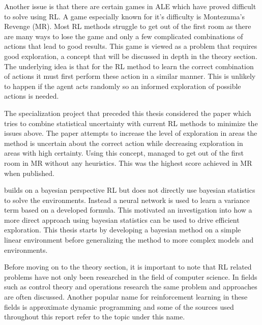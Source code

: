 Another issue is that there are certain games in ALE which have proved difficult to solve using RL. A game especially known for it's difficulty is Montezuma's Revenge (MR). Most RL methods struggle to get out of the first room as there are many ways to lose the game and only a few complicated combinations of actions that lead to good results. This game is viewed as a problem that requires good exploration, a concept that will be discussed in depth in the theory section. The underlying idea is that for the RL method to learn the correct combination of actions it must first perform these action in a similar manner. This is unlikely to happen if the agent acts randomly so an informed exploration of possible actions is needed.

The specialization project that preceded this thesis considered the paper \cite{donoghue_2017} which tries to combine statistical uncertainty with current RL methods to minimize the issues above. The paper attempts to increase the level of exploration in areas the method is uncertain about the correct action while decreasing exploration in areas with high certainty. Using this concept, \cite{donoghue_2017} managed to get out of the first room in MR without any heuristics. This was the highest score achieved in MR when published.

\cite{donoghue_2017} builds on a bayesian perspective RL but does not directly use bayesian statistics to solve the environments. Instead a neural network is used to learn a variance term based on a developed formula. This motivated an investigation into how a more direct approach using bayesian statistics can be used to drive efficient exploration. This thesis starts by developing a bayesian method on a simple linear environment before generalizing the method to more complex models and environments.

Before moving on to the theory section, it is important to note that RL related problems have not only been researched in the field of computer science. In fields such as control theory and operations research the same problem and approaches are often discussed. Another popular name for reinforcement learning in these fields is approximate dynamic programming and some of the sources used throughout this report refer to the topic under this name. \citep[p.~16]{powell_2011}

\cleardoublepage
